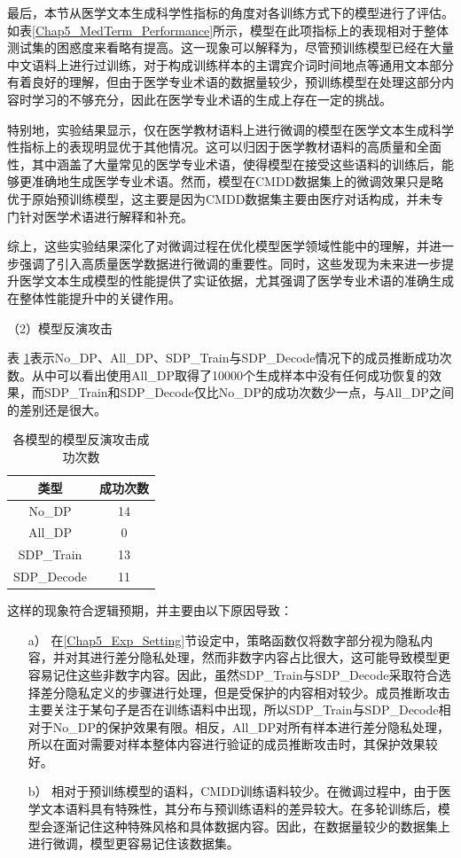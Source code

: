 最后，本节从医学文本生成科学性指标的角度对各训练方式下的模型进行了评估。如表\ref{Chap5_MedTerm_Performance}所示，模型在此项指标上的表现相对于整体测试集的困惑度来看略有提高。这一现象可以解释为，尽管预训练模型已经在大量中文语料上进行过训练，对于构成训练样本的主谓宾介词时间地点等通用文本部分有着良好的理解，但由于医学专业术语的数据量较少，预训练模型在处理这部分内容时学习的不够充分，因此在医学专业术语的生成上存在一定的挑战。

特别地，实验结果显示，仅在医学教材语料上进行微调的模型在医学文本生成科学性指标上的表现明显优于其他情况。这可以归因于医学教材语料的高质量和全面性，其中涵盖了大量常见的医学专业术语，使得模型在接受这些语料的训练后，能够更准确地生成医学专业术语。然而，模型在CMDD数据集上的微调效果只是略优于原始预训练模型，这主要是因为CMDD数据集主要由医疗对话构成，并未专门针对医学术语进行解释和补充。

综上，这些实验结果深化了对微调过程在优化模型医学领域性能中的理解，并进一步强调了引入高质量医学数据进行微调的重要性。同时，这些发现为未来进一步提升医学文本生成模型的性能提供了实证依据，尤其强调了医学专业术语的准确生成在整体性能提升中的关键作用。

（2）模型反演攻击



表 \ref{Chap5_Mem_Infer_Number}表示No\_DP、All\_DP、SDP\_Train与SDP\_Decode情况下的成员推断成功次数。从中可以看出使用All\_DP取得了10000个生成样本中没有任何成功恢复的效果，而SDP\_Train和SDP\_Decode仅比No\_DP的成功次数少一点，与All\_DP之间的差别还是很大。

\begin{table}[]
	\centering
	\caption{各模型的模型反演攻击成功次数}
	\begin{tabular}{|c|c|}
		\hline
		类型&成功次数   \\ \hline
		No\_DP& 14    \\ \hline
		All\_DP& 0   \\ \hline
		SDP\_Train&13    \\ \hline
		SDP\_Decode&11    \\ \hline
	\end{tabular}
	\label{Chap5_Mem_Infer_Number}
\end{table}

这样的现象符合逻辑预期，并主要由以下原因导致：

\begin{itemize}
	\item [a）]
	在\ref{Chap5_Exp_Setting}节设定中，策略函数仅将数字部分视为隐私内容，并对其进行差分隐私处理，然而非数字内容占比很大，这可能导致模型更容易记住这些非数字内容。因此，虽然SDP\_Train与SDP\_Decode采取符合选择差分隐私定义的步骤进行处理，但是受保护的内容相对较少。成员推断攻击主要关注于某句子是否在训练语料中出现，所以SDP\_Train与SDP\_Decode相对于No\_DP的保护效果有限。相反，All\_DP对所有样本进行差分隐私处理，所以在面对需要对样本整体内容进行验证的成员推断攻击时，其保护效果较好。
	\item [b）]
	相对于预训练模型的语料，CMDD训练语料较少。在微调过程中，由于医学文本语料具有特殊性，其分布与预训练语料的差异较大。在多轮训练后，模型会逐渐记住这种特殊风格和具体数据内容。因此，在数据量较少的数据集上进行微调，模型更容易记住该数据集。
	
\end{itemize}

